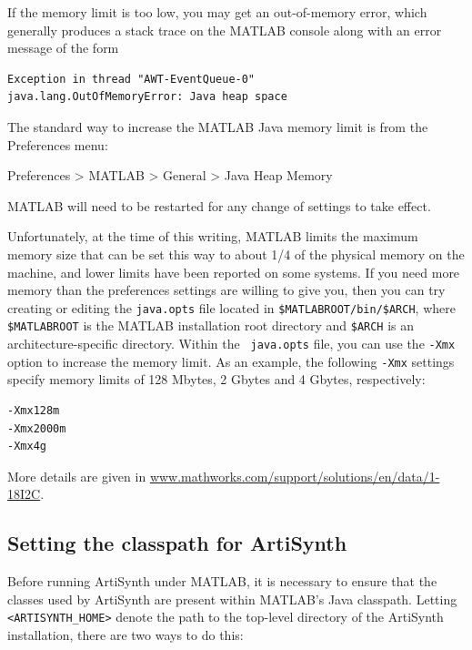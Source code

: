 \documentclass{article}
\begin{document}
If the memory limit is too low, you may get an out-of-memory error,
which generally produces a stack trace on the MATLAB console along
with an error message of the form
%
\begin{lstlisting}[]
Exception in thread "AWT-EventQueue-0"
java.lang.OutOfMemoryError: Java heap space
\end{lstlisting}
%

The standard way to increase the MATLAB Java memory limit is from the
{\sf Preferences} menu:

{\sf Preferences > MATLAB > General > Java Heap Memory}

MATLAB will need to be restarted for any change of settings to take
effect.

Unfortunately, at the time of this writing, MATLAB limits the maximum
memory size that can be set this way to about 1/4 of the physical
memory on the machine, and lower limits have been reported on some
systems. If you need more memory than the preferences
settings are willing to give you, then you can try creating or editing
the {\tt java.opts} file located in {\tt \$MATLABROOT/bin/\$ARCH},
where {\tt \$MATLABROOT} is the MATLAB installation root directory and
{\tt \$ARCH} is an architecture-specific directory. Within the {\tt
java.opts} file, you can use the {\tt -Xmx} option to increase the
memory limit. As an example, the following {\tt -Xmx} settings
specify memory limits of 128 Mbytes, 2 Gbytes and 4 Gbytes,
respectively:
%
\begin{lstlisting}[]
-Xmx128m 
-Xmx2000m
-Xmx4g
\end{lstlisting}
%
More details are given in
\href{http://www.mathworks.com/support/solutions/en/data/1-18I2C}
{www.mathworks.com/support/solutions/en/data/1-18I2C}.

\subsection{Setting the classpath for ArtiSynth}
\label{ArtisynthClasspath:sec}

Before running ArtiSynth under MATLAB, it is necessary to ensure that
the classes used by ArtiSynth are present within MATLAB's Java
classpath. Letting {\tt <ARTISYNTH\_HOME>} denote the path to the
top-level directory of the ArtiSynth installation, there are
two ways to do this:
\end{document}
